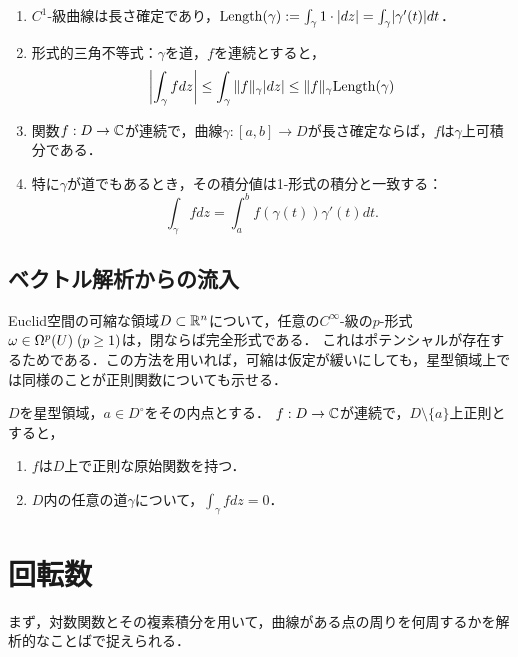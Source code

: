 \documentclass[uplatex, dvipdfmx]{jsreport}
\begin{document}
\begin{proposition}\mbox{}
    \begin{enumerate}
        \item $C^1$-級曲線は長さ確定であり，$\mathrm{Length}(\gamma):=\int_\gamma 1\cdot\lvert dz\rvert=\int_\gamma\lvert\gamma'(t)\rvert dt$．
        \item 形式的三角不等式：$\gamma$を道，$f$を連続とすると，
        \[\left|\int_\gamma fdz\right|\le\int_\gamma\|f\|_\gamma\lvert dz\rvert\le\|f\|_\gamma\mathrm{Length}(\gamma)\]
        \item 関数$f:D\to\mathbb{C}$が連続で，曲線$\gamma:[a,b]\to D$が長さ確定ならば，$f$は$\gamma$上可積分である．
        \item 特に$\gamma$が道でもあるとき，その積分値は1-形式の積分と一致する：
        \[\int_\gamma fdz=\int^b_af(\gamma(t))\gamma'(t)dt.\]
    \end{enumerate}
\end{proposition}

\subsection{ベクトル解析からの流入}

\begin{discussion}[ベクトル解析の結果の翻訳]
    Euclid空間の可縮な領域$D\subset\mathbb{R}^n$について，任意の$C^\infty$-級の$p$-形式$\omega\in\Omega^p(U)\;(p\ge 1)$は，閉ならば完全形式である．
    これはポテンシャルが存在するためである．この方法を用いれば，可縮は仮定が緩いにしても，星型領域上では同様のことが正則関数についても示せる．
\end{discussion}

\begin{theorem}
    $D$を星型領域，$a\in D^\circ$をその内点とする．
    $f:D\to\mathbb{C}$が連続で，$D\setminus\{a\}$上正則とすると，
    \begin{enumerate}
        \item $f$は$D$上で正則な原始関数を持つ．
        \item $D$内の任意の道$\gamma$について，$\int_\gamma fdz=0$．
    \end{enumerate}
\end{theorem}

\section{回転数}

\begin{tcolorbox}[colframe=ForestGreen, colback=ForestGreen!10!white,breakable,colbacktitle=ForestGreen!40!white,coltitle=black,fonttitle=\bfseries\sffamily,
title=]
    まず，対数関数とその複素積分を用いて，曲線がある点の周りを何周するかを解析的なことばで捉えられる．
\end{tcolorbox}
\end{document}

